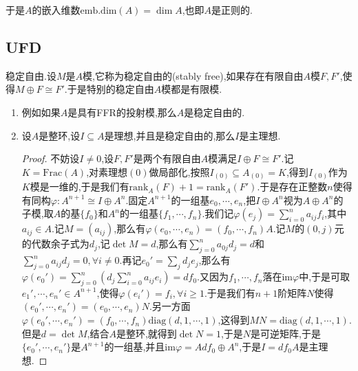 \begin{enumerate}
    于是$A$的嵌入维数$\mathrm{emb.dim}(A)=\dim A$,也即$A$是正则的.
\end{enumerate}
\newpage
\subsection{UFD}

稳定自由.设$M$是$A$模,它称为稳定自由的(stably free),如果存在有限自由$A$模$F,F'$,使得$M\oplus F\cong F'$.于是特别的稳定自由$A$模都是有限模.
\begin{enumerate}
	\item 例如如果$A$是具有FFR的投射模,那么$A$是稳定自由的.
	\item 设$A$是整环,设$I\subseteq A$是理想,并且是稳定自由的,那么$I$是主理想.
	\begin{proof}
		
		不妨设$I\not=0$,设$F,F'$是两个有限自由$A$模满足$I\oplus F\cong F'$.记$K=\mathrm{Frac}(A)$,对素理想$(0)$做局部化,按照$I_{(0)}\subseteq A_{(0)}=K$,得到$I_{(0)}$作为$K$模是一维的,于是我们有$\mathrm{rank}_A(F)+1=\mathrm{rank}_A(F')$.于是存在正整数$n$使得有同构$\varphi:A^{n+1}\cong I\oplus A^n$.固定$A^{n+1}$的一组基$e_0,\cdots,e_n$,把$I\oplus A^n$视为$A\oplus A^n$的子模,取$A$的基$\{f_0\}$和$A^n$的一组基$\{f_1,\cdots,f_n\}$.我们记$\varphi(e_j)=\sum_{i=0}^na_{ij}f_i$,其中$a_{ij}\in A$.记$M=\left(a_{ij}\right)$,那么有$\varphi(e_0,\cdots,e_n)=(f_0,\cdots,f_n)A$.记$M$的$(0,j)$元的代数余子式为$d_j$,记$\det M=d$,那么有$\sum_{j=0}^na_{0j}d_j=d$和$\sum_{j=0}^na_{ij}d_j=0,\forall i\not=0$.再记$e_0'=\sum_jd_je_j$,那么有$\varphi(e_0')=\sum_{j=0}^n\left(d_j\sum_{i=0}^na_{ij}e_i\right)=df_0$.又因为$f_1,\cdots,f_n$落在$\mathrm{im}\varphi$中,于是可取$e_1',\cdots,e_n'\in A^{n+1}$,使得$\varphi(e_i')=f_i,\forall i\ge1$.于是我们有$n+1$阶矩阵$N$使得$(e_0',\cdots,e_n')=(e_0,\cdots,e_n)N$.另一方面$\varphi(e_0',\cdots,e_n')=(f_0,\cdots,f_n)\mathrm{diag}(d,1,\cdots,1)$,这得到$MN=\mathrm{diag}(d,1,\cdots,1)$.但是$d=\det M$,结合$A$是整环,就得到$\det N=1$,于是$N$是可逆矩阵,于是$\{e_0',\cdots,e_n'\}$是$A^{n+1}$的一组基,并且$\mathrm{im}\varphi=Adf_0\oplus A^n$,于是$I=df_0A$是主理想.
	\end{proof}
\end{enumerate}

